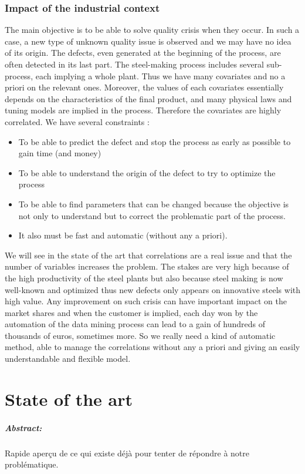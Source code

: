 \documentclass[12pt,a4paper]{report}
\begin{document}
	\subsection{Impact of the industrial context}
	 The main objective is to be able to solve quality crisis when they occur. In such a case, a new type of unknown quality issue is observed and we may have no idea of its origin. The defects, even generated at the beginning of the process, are often detected in its last part. The steel-making process includes several sub-process, each implying a whole plant. Thus we have many covariates and no a priori on the relevant ones. Moreover, the values of each covariates essentially depends on the characteristics of the final product, and many physical laws and tuning models are implied in the process. Therefore the covariates are highly correlated.
	We have several constraints :
	\begin{itemize}
		\item To be able to predict the defect and stop the process as early as possible to gain time (and money)
		\item To be able to understand the origin of the defect to try to optimize the process
		\item To be able to find parameters that can be changed because the objective is not only to understand but to correct the problematic part of the process.
		\item It also must be fast and automatic (without any a priori).
	\end{itemize}
	We will see in the state of the art that correlations are a real issue and that the number of variables increases the problem.	
	The stakes are very high because of the high productivity of the steel plants but also because steel making is now well-known and optimized thus new defects only appears on innovative steels with high value. Any improvement on such crisis can have important impact on the market shares and when the customer is implied, each day won by the automation of the data mining process can lead to a gain of hundreds of thousands of euros, sometimes more. So we really need a kind of automatic method, able to manage the correlations without any a priori and giving an easily understandable and flexible model.
	
\chapter{State of the art}
\paragraph{Abstract:} Rapide aperçu de ce qui existe déjà pour tenter de répondre à notre problématique.
\end{document}
